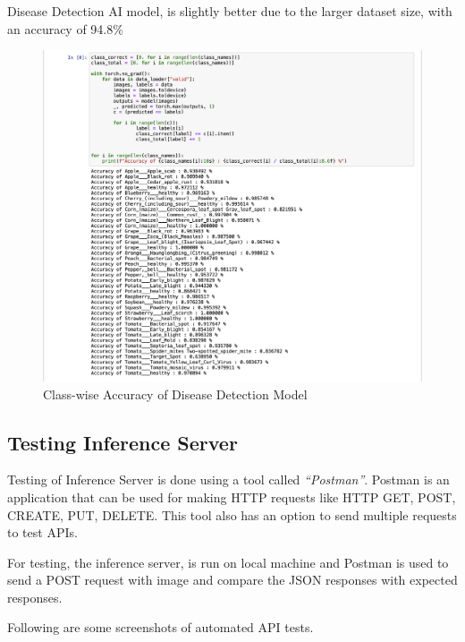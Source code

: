 \documentclass[../Report.tex]{subfiles}
\begin{document}
Disease Detection AI model, is slightly better due to the larger dataset size, with an accuracy of 94.8\%
\begin{figure}[H]
  \centering
  \includegraphics[width=\linewidth]{images/disease_class_acc.png}
  \caption{Class-wise Accuracy of Disease Detection Model}
  \label{fig:test_ai_disease_class_acc}
\end{figure}\par

\subsection{Testing Inference Server}

Testing of Inference Server is done using a tool called \textit{``Postman''}. Postman is an application that can be used for making HTTP 
requests like HTTP GET, POST, CREATE, PUT, DELETE. This tool also has an option to send multiple requests to test APIs.\par

For testing, the inference server, is run on local machine and Postman is used to send a POST request with image and compare the JSON 
responses with expected responses.\par

Following are some screenshots of automated API tests.\par
\end{document}
